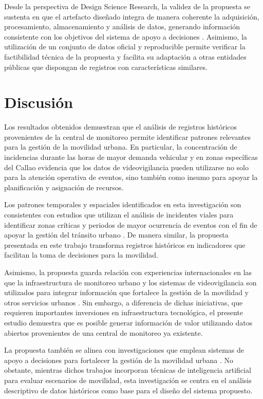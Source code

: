 \documentclass[]{IEEEphot}
\begin{document}
Desde la perspectiva de Design Science Research, la validez de la propuesta se sustenta en que el artefacto diseñado integra de manera coherente la adquisición, procesamiento, almacenamiento y análisis de datos, generando información consistente con los objetivos del sistema de apoyo a decisiones \cite{hevner2004design,peffers2007dsrm}. Asimismo, la utilización de un conjunto de datos oficial y reproducible permite verificar la factibilidad técnica de la propuesta y facilita su adaptación a otras entidades públicas que dispongan de registros con características similares.

\section{Discusión}

Los resultados obtenidos demuestran que el análisis de registros históricos provenientes de la central de monitoreo permite identificar patrones relevantes para la gestión de la movilidad urbana. En particular, la concentración de incidencias durante las horas de mayor demanda vehicular y en zonas específicas del Callao evidencia que los datos de videovigilancia pueden utilizarse no solo para la atención operativa de eventos, sino también como insumo para apoyar la planificación y asignación de recursos.

Los patrones temporales y espaciales identificados en esta investigación son consistentes con estudios que utilizan el análisis de incidentes viales para identificar zonas críticas y periodos de mayor ocurrencia de eventos con el fin de apoyar la gestión del tránsito urbano \cite{pedraza2025smart}. De manera similar, la propuesta presentada en este trabajo transforma registros históricos en indicadores que facilitan la toma de decisiones para la movilidad.

Asimismo, la propuesta guarda relación con experiencias internacionales en las que la infraestructura de monitoreo urbano y los sistemas de videovigilancia son utilizados para integrar información que fortalece la gestión de la movilidad y otros servicios urbanos \cite{schreiner2016international,lee2016international}. Sin embargo, a diferencia de dichas iniciativas, que requieren importantes inversiones en infraestructura tecnológica, el presente estudio demuestra que es posible generar información de valor utilizando datos abiertos provenientes de una central de monitoreo ya existente.

La propuesta también se alinea con investigaciones que emplean sistemas de apoyo a decisiones para fortalecer la gestión de la movilidad urbana \cite{shulajkovska2024artificial}. No obstante, mientras dichos trabajos incorporan técnicas de inteligencia artificial para evaluar escenarios de movilidad, esta investigación se centra en el análisis descriptivo de datos históricos como base para el diseño del sistema propuesto.
\end{document}
